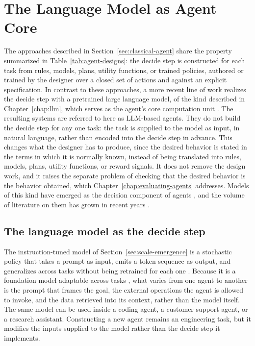\section{The Language Model as Agent Core}
\label{sec:llm-decision-component}

The approaches described in Section~\ref{sec:classical-agent} share the property summarized in Table~\ref{tab:agent-designs}: the decide step is constructed for each task from rules, models, plans, utility functions, or trained policies, authored or trained by the designer over a closed set of actions and against an explicit specification. In contrast to these approaches, a more recent line of work realizes the decide step with a pretrained large language model, of the kind described in Chapter~\ref{chap:llm}, which serves as the agent's core computation unit \cite{zhaoSurveyLargeLanguage2026}. The resulting systems are referred to here as LLM-based agents. They do not build the decide step for any one task: the task is supplied to the model as input, in natural language, rather than encoded into the decide step in advance. This changes what the designer has to produce, since the desired behavior is stated in the terms in which it is normally known, instead of being translated into rules, models, plans, utility functions, or reward signals. It does not remove the design work, and it raises the separate problem of checking that the desired behavior is the behavior obtained, which Chapter~\ref{chap:evaluating-agents} addresses. Models of this kind have emerged as the decision component of agents \cite{zhaoSurveyLargeLanguage2026}, and the volume of literature on them has grown in recent years \cite{wangSurveyLargeLanguage2024}.

\subsection{The language model as the decide step}
\label{subsec:new-decide-step}

The instruction-tuned model of Section~\ref{sec:scale-emergence} is a stochastic policy that takes a prompt as input, emits a token sequence as output, and generalizes across tasks without being retrained for each one \cite{ouyangTrainingLanguageModels2022}. Because it is a foundation model adaptable across tasks \cite{bommasaniOpportunitiesRisksFoundation2022}, what varies from one agent to another is the prompt that frames the goal, the external operations the agent is allowed to invoke, and the data retrieved into its context, rather than the model itself. The same model can be used inside a coding agent, a customer-support agent, or a research assistant. Constructing a new agent remains an engineering task, but it modifies the inputs supplied to the model rather than the decide step it implements.

